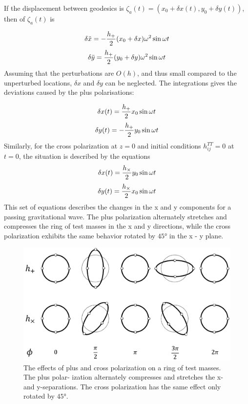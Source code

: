 \documentclass[binding=0.6cm, LaM]{sapthesis}
\begin{document}
If the displacement between geodesics is $\zeta_a (t) = (x_0 + \delta x(t), y_0 + \delta y(t))$, then of $\zeta_a (t)$ is 

\begin{equation}
\delta {\ddot x} = - {{h_{+}} \over 2} (x_0 + \delta x) \omega ^2 \sin \omega t
\end{equation}
\begin{equation}
\delta {\ddot y} =  {{h_{+}} \over 2} (y_0 + \delta y) \omega ^2 \sin \omega t
\end{equation}
Assuming that the perturbations are $O(h)$, and thus small compared to the unperturbed locations, $\delta x$ and $\delta y$ can be neglected.
The integrations gives the deviations caused by the plus polarisations:

\begin{equation}
\delta x(t) =  {{h_{+}} \over 2} x_0 \sin \omega t
\end{equation}
\begin{equation}
\delta y(t) = - {{h_{+}} \over 2} y_0  \sin \omega t
\end{equation}
Similarly, for the cross polarization at $z=0$ and initial conditions $h_{ij}^{TT} = 0$ at $t= 0$, the situation is described by the equations
\begin{equation}
\delta x(t) =  {{h_{\times}} \over 2} y_0 \sin \omega t
\end{equation}
\begin{equation}
\delta y(t) =  {{h_{\times}} \over 2} x_0  \sin \omega t
\end{equation}
This set of equations describes the changes in the x and y components for a passing gravitational wave. The plus polarization alternately stretches and compresses the ring of test masses in the x and y directions, while the cross polarization exhibits the same behavior rotated by $\ang{45}$ in the x - y plane. 

\begin{figure}
\includegraphics[scale=1]{ring}
\centering
\caption{The effects of plus and cross polarization on a ring of test masses. The plus polar- ization alternately compresses and stretches the x- and y-separations. The cross polarization has the same effect only rotated by  $\ang{45}$.}
\label{fig:ring}
\end{figure}
\end{document}
